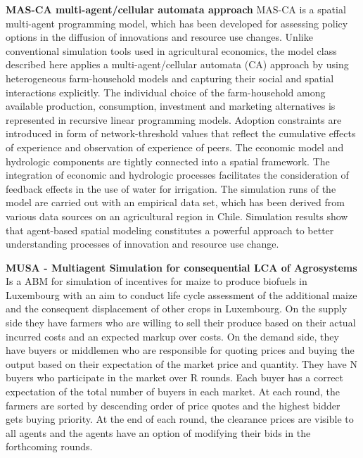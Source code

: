 \documentclass[letterpaper, 10 pt, conference]{ieeeconf}  %
\begin{document}
\textbf{MAS-CA  multi-agent/cellular automata approach} \cite{Berger2001} MAS-CA is a spatial multi-agent programming model, which has been developed for assessing policy options in the diffusion of innovations and resource use changes. Unlike conventional simulation tools used in agricultural economics, the model class described here applies a multi-agent/cellular automata (CA) approach by using heterogeneous farm-household models and capturing their social and spatial interactions explicitly. The individual choice of the farm-household among available production, consumption, investment and marketing alternatives is represented in recursive linear programming models. Adoption constraints are introduced in form of network-threshold values that reflect the cumulative effects of experience and observation of experience of peers. The economic model and hydrologic components are tightly connected into a spatial framework. The integration of economic and hydrologic processes facilitates the consideration of feedback effects in the use of water for irrigation. The simulation runs of the model are carried out with an empirical data set, which has been derived from various data sources on an agricultural region in Chile. Simulation results show that agent-based spatial modeling constitutes a powerful approach to better understanding processes of innovation and resource use change.

\textbf{MUSA - Multiagent Simulation for consequential LCA of Agrosystems} \cite{Rege2015} Is a ABM for simulation of incentives for maize to produce biofuels in Luxembourg with an aim to conduct life cycle assessment of the additional maize and the consequent displacement of other crops in Luxembourg. On the supply side they have farmers who are willing to sell their produce based on their actual incurred costs and an expected markup over costs. On the demand side, they have buyers or middlemen who are responsible for quoting prices and buying the output based on their expectation of the market price and quantity. They have N buyers who participate in the market over R rounds. Each buyer has a correct expectation of the total number of buyers in each market. At each round, the farmers are sorted by descending order of price quotes and the highest bidder gets buying priority. At the end of each round, the clearance prices are visible to all agents and the agents have an option of modifying their bids in the forthcoming rounds.
\end{document}
